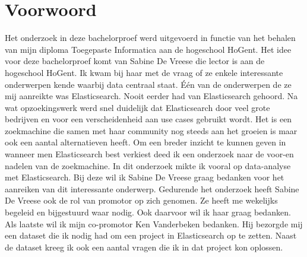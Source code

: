 
\chapter{Voorwoord}
\label{ch:voorwoord}


Het onderzoek in deze bachelorproef werd uitgevoerd in functie van het behalen van mijn diploma Toegepaste Informatica aan de hogeschool HoGent. Het idee voor deze bachelorproef komt van Sabine De Vreese die lector is aan de hogeschool HoGent. Ik kwam bij haar met de vraag of ze enkele interessante onderwerpen kende waarbij data centraal staat. Één van de onderwerpen de ze mij aanreikte was Elasticsearch. Nooit eerder had van Elasticsearch gehoord. Na wat opzoekingswerk werd snel duidelijk dat Elasticsearch door veel grote bedrijven en voor een verscheidenheid aan use cases gebruikt wordt. Het is een zoekmachine die samen met haar community nog steeds aan het groeien is maar ook een aantal alternatieven heeft. Om een breder inzicht te kunnen geven in wanneer men Elasticsearch best verkiest deed ik een onderzoek naar de voor-en nadelen van de zoekmachine. In dit onderzoek mikte ik vooral op data-analyse met Elasticsearch. Bij deze wil ik Sabine De Vreese graag bedanken voor het aanreiken van dit interessante onderwerp. Gedurende het onderzoek heeft Sabine De Vreese ook de rol van promotor op zich genomen. Ze heeft me wekelijks begeleid en bijgestuurd waar nodig. Ook daarvoor wil ik haar graag bedanken. Als laatste wil ik mijn co-promotor Ken Vanderbeken bedanken. Hij bezorgde mij een dataset die ik nodig had om een project in Elasticsearch op te zetten. Naast de dataset kreeg ik ook een aantal vragen die ik in dat project kon oplossen.

